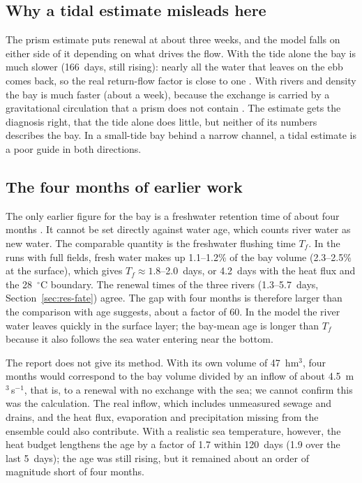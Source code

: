 \documentclass[a4paper,fleqn]{ems-dc}
\begin{document}
\subsection{Why a tidal estimate misleads here}
The prism estimate puts renewal at about three weeks, and the model falls on either side of
it depending on what drives the flow. With the tide alone the bay is much slower (166~days,
still rising): nearly all the water that leaves on the ebb comes back, so the real
return-flow factor is close to one \citep{Sanford1992}. With rivers and density the bay is much faster (about a
week), because the exchange is carried by a gravitational circulation that a prism does not
contain \citep{MacCready2010}. The estimate gets the diagnosis right, that the tide alone does little, but neither
of its numbers describes the bay. In a small-tide bay behind a narrow channel, a tidal
estimate is a poor guide in both directions.

\subsection{The four months of earlier work}\label{sec:jica}
The only earlier figure for the bay is a freshwater retention time of about four months
\citep{JICA2004}. It cannot be set directly against water age, which counts river water as
new water. The comparable quantity is the freshwater flushing time $T_f$. In the runs with
full fields, fresh water makes up 1.1--1.2\% of the bay volume (2.3--2.5\% at the surface),
which gives $T_f \approx 1.8$--2.0~days, or 4.2~days with the heat flux and the 28~$^\circ$C
boundary. The renewal times of the three rivers (1.3--5.7~days, Section~\ref{sec:res-fate})
agree. The gap with four months is therefore larger than the comparison with age suggests,
about a factor of 60. In the model the river water leaves quickly in the surface layer; the
bay-mean age is longer than $T_f$ because it also follows the sea water entering near the
bottom.

The report does not give its method. With its own volume of 47~hm$^3$, four months would
correspond to the bay volume divided by an inflow of about 4.5~m$^3$\,s$^{-1}$, that is, to
a renewal with no exchange with the sea; we cannot confirm this was the calculation. The
real inflow, which includes unmeasured sewage and drains, and the heat flux, evaporation and
precipitation missing from the ensemble could also contribute. With a realistic sea
temperature, however, the heat budget lengthens the age by a factor of 1.7 within 120~days
(1.9 over the last 5~days); the age was still rising, but it remained about an order of
magnitude short of four months.
\end{document}
